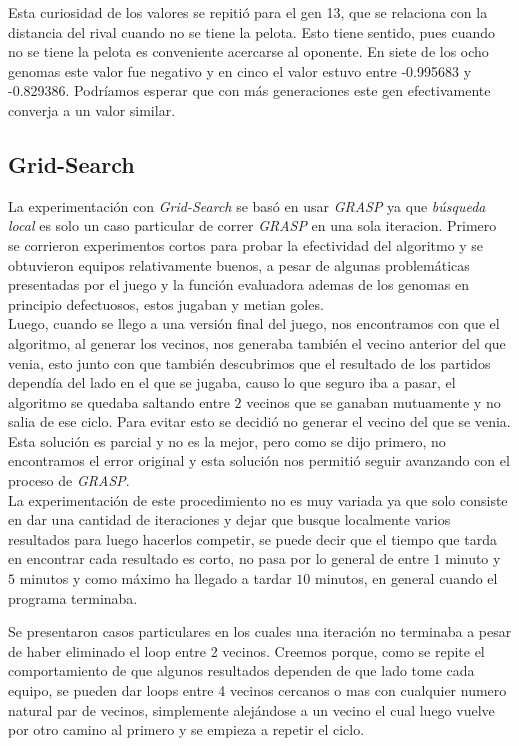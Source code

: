 Esta curiosidad de los valores se repitió para el gen 13, que se relaciona con la distancia del rival cuando no se tiene la pelota. Esto tiene sentido, pues cuando no se tiene la pelota es conveniente acercarse al oponente. En siete de los ocho genomas este valor fue negativo y en cinco el valor estuvo entre -0.995683 y -0.829386. Podríamos esperar que con más generaciones este gen efectivamente converja a un valor similar.



\subsection{Grid-Search}

La experimentación con \emph{Grid-Search} se basó en usar \emph{GRASP} ya que \emph{búsqueda local} es solo un caso particular
de correr \emph{GRASP} en una sola iteracion.
Primero se corrieron experimentos cortos para probar la efectividad del algoritmo y se obtuvieron equipos relativamente buenos,
a pesar de algunas problemáticas presentadas por el juego y la función evaluadora ademas de los genomas en principio defectuosos,
estos jugaban y metian goles.\\

Luego, cuando se llego a una versión final del juego, nos encontramos con que el algoritmo, al generar los vecinos, nos generaba también
el vecino anterior del que venia, esto junto con que también descubrimos que el resultado de los partidos dependía del lado en el
que se jugaba, causo lo que seguro iba a pasar, el algoritmo se quedaba saltando entre $2$ vecinos que se ganaban mutuamente y no
salia de ese ciclo.
Para evitar esto se decidió no generar el vecino del que se venia. Esta solución es parcial y no es la mejor, pero como se dijo primero,
no encontramos el error original y esta solución nos permitió seguir avanzando con el proceso de \emph{GRASP}.\\


La experimentación de este procedimiento no es muy variada ya que solo consiste en dar una cantidad de iteraciones y dejar que
busque localmente varios resultados para luego hacerlos competir, se puede decir que el tiempo que tarda en encontrar
cada resultado es corto, no pasa por lo general de entre $1$ minuto y $5$ minutos y como máximo ha llegado a tardar $10$ minutos, en general
cuando el programa terminaba.


Se presentaron casos particulares en los cuales una iteración no terminaba a pesar de haber eliminado el loop entre 2 vecinos.
Creemos porque, como se repite el comportamiento de que algunos resultados dependen de que lado tome cada equipo, se pueden dar
loops entre 4 vecinos cercanos o mas con cualquier numero natural par de vecinos, simplemente alejándose a un vecino el cual luego vuelve
por otro camino al primero y se empieza a repetir el ciclo.\\

